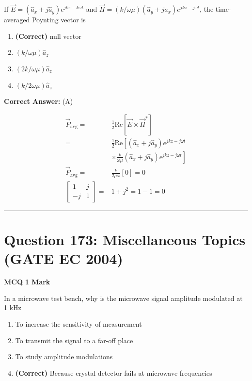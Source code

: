 \documentclass[11pt,a4paper]{article}
\begin{document}
\noindent If $\vec{E}=(\hat{a}_{x}+j\hat{a}_{y})e^{jkz-k\omega t}$ and $\vec{H}=(k/\omega \mu )(\hat{a}_{y}+j\hat{a}_{x})e^{jkz-j\omega t}$, the time-averaged Poynting vector is


\begin{enumerate}[label=(\Alph*)]
    \item \textbf{(Correct)} null vector
    \item $(k/\omega \mu )\hat{a}_{z}$
    \item $(2k/\omega \mu )\hat{a}_{z}$
    \item $(k/2\omega \mu )\hat{a}_{z}$
\end{enumerate}

\noindent \textbf{Correct Answer:} (A)

\begin{tcolorbox}[solbox, title=Detailed Solution -- Question 172]
\[
\begin{aligned} \vec{P}_{\mathrm{avg}}=& \frac{1}{2} \text{Re}\left[\vec{E} \times \vec{H}^{*}\right] \\ =& \frac{1}{2} \text{Re}\left[\left(\hat{a}_{x}+j \hat{a}_{y}\right) e^{j k z-j \omega t}\right.\\ &\left.\times\frac{k}{ \omega\mu}\left(\hat{a}_{x}+j \hat{a}_{y} \right)e^{j k z-j \omega t} \right ]\\ \vec{P}_{\mathrm{avg}}=& \frac{k}{2 \mu \omega}[0]=0 \\ \left[\begin{array}{cc}1 &j\\-j&1\end{array}\right]=&1+j^{2}=1-1=0 \end{aligned}
\]
\end{tcolorbox}

\vspace{1.5em}
\hrule
\vspace{1.5em}

\section*{Question 173: Miscellaneous Topics (GATE EC 2004)}
\noindent \textbf{\color{primary}MCQ} \hfill \textbf{\color{secondary}1 Mark}


\noindent In a microwave test bench, why is the microwave signal amplitude modulated at 1 kHz


\begin{enumerate}[label=(\Alph*)]
    \item To increase the sensitivity of measurement
    \item To transmit the signal to a far-off place
    \item To study amplitude modulations
    \item \textbf{(Correct)} Because crystal detector fails at microwave frequencies
\end{enumerate}
\end{document}

